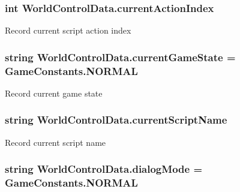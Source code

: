 \subsubsection[{\texorpdfstring{current\+Action\+Index}{currentActionIndex}}]{\setlength{\rightskip}{0pt plus 5cm}int World\+Control\+Data.\+current\+Action\+Index}\hypertarget{class_world_control_data_aa328aa4550803945ce301ef201145438}{}\label{class_world_control_data_aa328aa4550803945ce301ef201145438}


Record current script action index 

\subsubsection[{\texorpdfstring{current\+Game\+State}{currentGameState}}]{\setlength{\rightskip}{0pt plus 5cm}string World\+Control\+Data.\+current\+Game\+State = Game\+Constants.\+N\+O\+R\+M\+AL}\hypertarget{class_world_control_data_a69e2970295be1f325197b658c9a3eee2}{}\label{class_world_control_data_a69e2970295be1f325197b658c9a3eee2}


Record current game state 

\subsubsection[{\texorpdfstring{current\+Script\+Name}{currentScriptName}}]{\setlength{\rightskip}{0pt plus 5cm}string World\+Control\+Data.\+current\+Script\+Name}\hypertarget{class_world_control_data_ab5ae8d21120cd2b51005b7a17c5be09f}{}\label{class_world_control_data_ab5ae8d21120cd2b51005b7a17c5be09f}


Record current script name 

\subsubsection[{\texorpdfstring{dialog\+Mode}{dialogMode}}]{\setlength{\rightskip}{0pt plus 5cm}string World\+Control\+Data.\+dialog\+Mode = Game\+Constants.\+N\+O\+R\+M\+AL}\hypertarget{class_world_control_data_a6c7b437771b35a8ebd28d36956ec3617}{}\label{class_world_control_data_a6c7b437771b35a8ebd28d36956ec3617}


